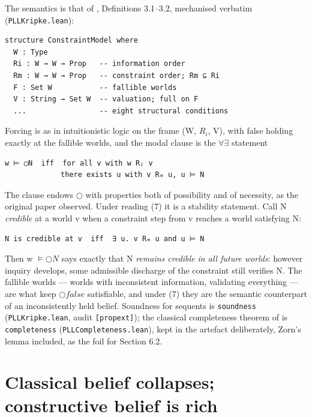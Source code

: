 The semantics is that of \cite{FairtloughMendler1997}, Definitions 3.1--3.2, mechanised
verbatim (\texttt{PLLKripke.lean}):

\begin{lstlisting}
structure ConstraintModel where
  W : Type
  Ri : W → W → Prop   -- information order
  Rm : W → W → Prop   -- constraint order; Rm ⊆ Ri
  F : Set W           -- fallible worlds
  V : String → Set W  -- valuation; full on F
  ...                 -- eight structural conditions
\end{lstlisting}

Forcing is as in intuitionistic logic on the frame (W, \ensuremath{R_{i}}, V), with
false holding exactly at the fallible worlds, and the modal clause is
the \ensuremath{\forall\exists} statement

\begin{lstlisting}
w ⊨ ◯N  iff  for all v with w Rᵢ v
             there exists u with v Rₘ u, u ⊨ N
\end{lstlisting}

The clause endows \ensuremath{\bigcirc} with properties both of possibility and of
necessity, as the original paper observed. Under reading (7) it is a
stability statement. Call N \emph{credible} at a world v when a
constraint step from v reaches a world satisfying N:

\begin{lstlisting}
N is credible at v  iff  ∃ u. v Rₘ u and u ⊨ N
\end{lstlisting}

Then w \ensuremath{\vDash \bigcirc N} says exactly that N \emph{remains credible in all
future worlds}: however inquiry develops, some admissible discharge of
the constraint still verifies N. The
fallible worlds --- worlds with inconsistent information, validating
everything --- are what keep \ensuremath{\bigcirc\mathit{false}} satisfiable, and under (7) they are
the semantic counterpart of an inconsistently held belief. Soundness for sequents is
\texttt{soundness} (\texttt{PLLKripke.lean}, audit \texttt{[propext]}); the classical
completeness theorem of \cite[\S4]{FairtloughMendler1997} is \texttt{completeness}
(\texttt{PLLCompleteness.lean}), kept in the artefact deliberately, Zorn's
lemma included, as the foil for Section 6.2.

\section{Classical belief collapses; constructive belief is rich}\label{3-classical-belief-collapses-constructive-belief-is-rich}

